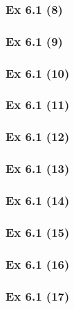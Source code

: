 \subsubsection{Ex 6.1 (8)}\label{sec:Ex_6.1.8}

\subsubsection{Ex 6.1 (9)}\label{sec:Ex_6.1.9}

\subsubsection{Ex 6.1 (10)}\label{sec:Ex_6.1.10}

\newpage		%

\subsubsection{Ex 6.1 (11)}\label{sec:Ex_6.1.11}

\subsubsection{Ex 6.1 (12)}\label{sec:Ex_6.1.12}

\subsubsection{Ex 6.1 (13)}\label{sec:Ex_6.1.13}

\subsubsection{Ex 6.1 (14)}\label{sec:Ex_6.1.14}

\subsubsection{Ex 6.1 (15)}\label{sec:Ex_6.1.15}

\subsubsection{Ex 6.1 (16)}\label{sec:Ex_6.1.16}

\subsubsection{Ex 6.1 (17)}\label{sec:Ex_6.1.17}

